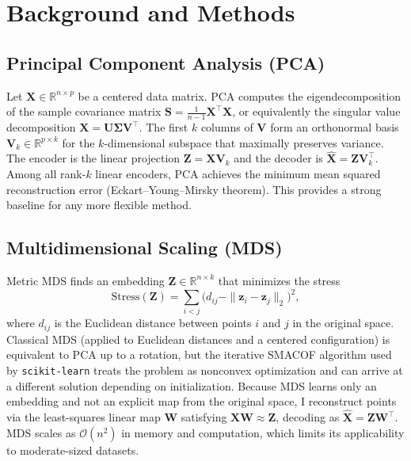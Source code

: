 \documentclass[11pt]{article}
\begin{document}
\section{Background and Methods}

\subsection{Principal Component Analysis (PCA)}

Let $\mathbf{X} \in \mathbb{R}^{n \times p}$ be a centered data matrix. PCA computes the eigendecomposition of the sample covariance matrix $\mathbf{S} = \frac{1}{n-1} \mathbf{X}^\top \mathbf{X}$, or equivalently the singular value decomposition $\mathbf{X} = \mathbf{U}\boldsymbol{\Sigma}\mathbf{V}^\top$. The first $k$ columns of $\mathbf{V}$ form an orthonormal basis $\mathbf{V}_k \in \mathbb{R}^{p \times k}$ for the $k$-dimensional subspace that maximally preserves variance. The encoder is the linear projection $\mathbf{Z} = \mathbf{X}\mathbf{V}_k$ and the decoder is $\widehat{\mathbf{X}} = \mathbf{Z} \mathbf{V}_k^\top$. Among all rank-$k$ linear encoders, PCA achieves the minimum mean squared reconstruction error (Eckart--Young--Mirsky theorem). This provides a strong baseline for any more flexible method.

\subsection{Multidimensional Scaling (MDS)}

Metric MDS finds an embedding $\mathbf{Z} \in \mathbb{R}^{n \times k}$ that minimizes the stress
\[
\text{Stress}(\mathbf{Z}) = \sum_{i < j} \bigl( d_{ij} - \| \mathbf{z}_i - \mathbf{z}_j \|_2 \bigr)^2,
\]
where $d_{ij}$ is the Euclidean distance between points $i$ and $j$ in the original space. Classical MDS (applied to Euclidean distances and a centered configuration) is equivalent to PCA up to a rotation, but the iterative SMACOF algorithm used by \texttt{scikit-learn} treats the problem as nonconvex optimization and can arrive at a different solution depending on initialization. Because MDS learns only an embedding and not an explicit map from the original space, I reconstruct points via the least-squares linear map $\mathbf{W}$ satisfying $\mathbf{X}\mathbf{W} \approx \mathbf{Z}$, decoding as $\widehat{\mathbf{X}} = \mathbf{Z}\mathbf{W}^\top$. MDS scales as $\mathcal{O}(n^2)$ in memory and computation, which limits its applicability to moderate-sized datasets.
\end{document}
